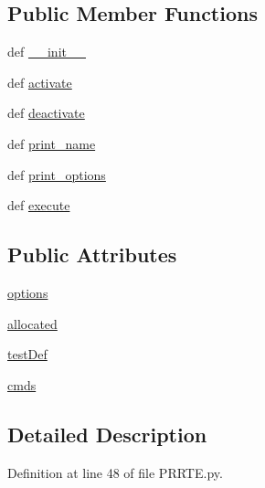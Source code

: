 \subsection*{Public Member Functions}
\begin{DoxyCompactItemize}
\item 
def \hyperlink{class_p_r_r_t_e_1_1_p_r_r_t_e_aab163ee5630ff741ddebce1f1a19dca6}{\-\_\-\-\_\-init\-\_\-\-\_\-}
\item 
def \hyperlink{class_p_r_r_t_e_1_1_p_r_r_t_e_aeb7fdaa1719c5203dc652ab0e09e208b}{activate}
\item 
def \hyperlink{class_p_r_r_t_e_1_1_p_r_r_t_e_a4ec48744745fb0829800dcfad01af45f}{deactivate}
\item 
def \hyperlink{class_p_r_r_t_e_1_1_p_r_r_t_e_a9531d7035e6acc2d9bcdd6e74e8d81f7}{print\-\_\-name}
\item 
def \hyperlink{class_p_r_r_t_e_1_1_p_r_r_t_e_aebd413e4294d6b247a3436557273f1c3}{print\-\_\-options}
\item 
def \hyperlink{class_p_r_r_t_e_1_1_p_r_r_t_e_aaf98bda8f91b9654255df6dd8ca90309}{execute}
\end{DoxyCompactItemize}
\subsection*{Public Attributes}
\begin{DoxyCompactItemize}
\item 
\hyperlink{class_p_r_r_t_e_1_1_p_r_r_t_e_a174321352f6234d4704b9a980574bdc7}{options}
\item 
\hyperlink{class_p_r_r_t_e_1_1_p_r_r_t_e_aa61e5452cb21084ebe29fddecf96b63e}{allocated}
\item 
\hyperlink{class_p_r_r_t_e_1_1_p_r_r_t_e_a797f27c656051565b7897358a7c28a40}{test\-Def}
\item 
\hyperlink{class_p_r_r_t_e_1_1_p_r_r_t_e_ac33721f4ed5d701613528962b88e16e3}{cmds}
\end{DoxyCompactItemize}


\subsection{Detailed Description}


Definition at line 48 of file P\-R\-R\-T\-E.\-py.




